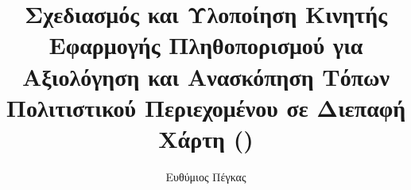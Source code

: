 \documentclass[11pt,a4paper,english,greek,twoside]{dblab-thesis}
\title{\Large{Σχεδιασμός και Υλοποίηση Κινητής Εφαρμογής Πληθοπορισμού για Αξιολόγηση και Ανασκόπηση Τόπων Πολιτιστικού Περιεχομένου σε Διεπαφή Χάρτη (\tl{React Native App Development})}}
\author{Ευθύμιος Πέγκας}
\begin{document}
\maketitle

\frontmatter
{}
\mainmatter

\tableofcontents
\listoffigures
\listoftables

\clearpage
\renewcommand\lstlistlistingname{Κατάλογος Παραθέσεων}
\renewcommand\lstlistingname{\selectlanguage{greek}Παράθεση}
\lstlistoflistings


% 
% 
% 









%


%



\backmatter
\printindex
\end{document}
